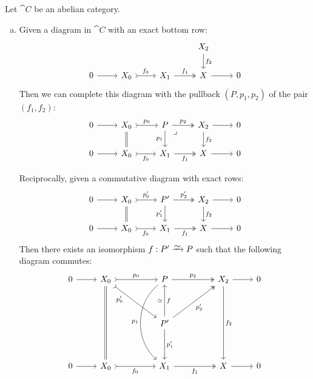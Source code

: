 \begin{theorem}
\label{thm:abelian-cat-completing-diagram}
Let \(\cat C\) be an abelian category.
\begin{enumerate}[(a)]\setlength\itemsep{0em}
\item Given a diagram in \(\cat C\) with an exact bottom row:
  \[
  \begin{tikzcd}
  & & &X_2 \ar[d, "f_2"] & \\
  0 \ar[r]
  &X_0 \ar[r, tail, "f_0"]
  &X_1 \ar[r, two heads, "f_1"]
  &X \ar[r]
  &0
  \end{tikzcd}
  \]
  Then we can complete this diagram with the pullback \((P, p_1, p_2)\) of the
  pair \((f_1, f_2)\):
  \[
  \begin{tikzcd}
  0 \ar[r]
  &X_0
  \ar[d, equals]
  \ar[r, "p_0", tail]
  &P
  \ar[rd, "\lrcorner", phantom, very near start]
  \ar[r, "p_2", two heads]
  \ar[d, "p_1"']
  &X_2
  \ar[d, "f_2"]
  \ar[r]
  &0 \\
  0 \ar[r]
  &X_0 \ar[r, tail, "f_0"']
  &X_1 \ar[r, two heads, "f_1"']
  &X \ar[r]
  &0
  \end{tikzcd}
  \]

  Reciprocally, given a commutative diagram with exact rows:
  \[
  \begin{tikzcd}
  0 \ar[r]
  &X_0
  \ar[d, equals]
  \ar[r, "p_0'", tail]
  &P'
  \ar[r, "p_2'", two heads]
  \ar[d, "p_1'"']
  &X_2
  \ar[d, "f_2"]
  \ar[r]
  &0 \\
  0 \ar[r]
  &X_0 \ar[r, tail, "f_0"']
  &X_1 \ar[r, two heads, "f_1"']
  &X \ar[r]
  &0
  \end{tikzcd}
  \]
  Then there exists an isomorphism \(f: P' \isoto P\) such that the following
  diagram commutes:
  \[
  \begin{tikzcd}
  0
  \ar[r]
  &X_0
  \ar[dddd, equals]
  \ar[rr, "p_0", tail]
  \ar[rrdd, "p_0'"', near start, tail, crossing over]
  &
  &P
  \ar[rr, "p_2", two heads]
  \ar[dddd, "p_1"', bend right=50]
  &
  &X_2
  \ar[dddd, "f_2"]
  \ar[r]
  &0
  \\
  &
  &
  &
  &
  &
  &
  \\
  &
  &
  &P'
  \ar[uu, "f"', "\dis"]
  \ar[uurr, "p_2'"', two heads]
  \ar[dd, "p_1'"]
  &
  &
  &
  \\
  &
  &
  &
  &
  \\
  0
  \ar[r]
  &X_0
  \ar[rr, tail, "f_0"']
  &
  &X_1
  \ar[rr, two heads, "f_1"']
  &
  &X
  \ar[r]
  &0
  \end{tikzcd}
  \]



\end{enumerate}
\end{theorem}
